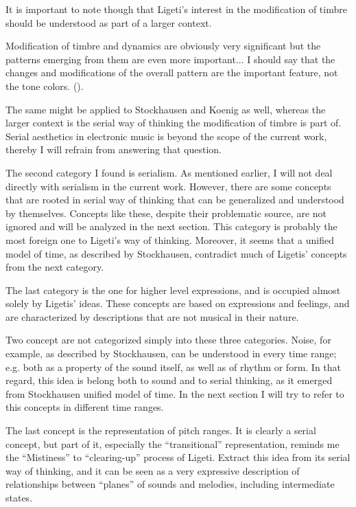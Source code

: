 \documentclass[a4paper,11pt]{article}
\newenvironment{MyShadequote}[1][]
    {\begin{mdframed}[style=MyShadeQuoteStyle,#1]}
    {\end{mdframed}}
\begin{document}
It is important to note though that Ligeti's interest in the modification of timbre should be understood as part of a larger context.

\begin{MyShadequote}
  Modification of timbre and dynamics are obviously very significant but the patterns emerging from them are even more important...
  I should say that the changes and modifications of the overall pattern are the important feature, not the tone colors. (\cite[p. 39]{varnai}).
\end{MyShadequote}

The same might be applied to Stockhausen and Koenig as well, whereas the larger context is the serial way of thinking the modification of timbre is part of.
Serial aesthetics in electronic music is beyond the scope of the current work, thereby I will refrain from answering that question.

The second category I found is serialism.
As mentioned earlier, I will not deal directly with serialism in the current work.
However, there are some concepts that are rooted in serial way of thinking that can be generalized and understood by themselves.
Concepts like these, despite their problematic source, are not ignored and will be analyzed in the next section.
This category is probably the most foreign one to Ligeti's way of thinking.
Moreover, it seems that a unified model of time, as described by Stockhausen, contradict much of Ligetis' concepts from the next category.

The last category is the one for higher level expressions, and is occupied almost solely by Ligetis' ideas.
These concepts are based on expressions and feelings, and are characterized by descriptions that are not musical in their nature.

Two concept are not categorized simply into these three categories.
Noise, for example, as described by Stockhausen, can be understood in every time range;
e.g. both as a property of the sound itself, as well as of rhythm or form.
In that regard, this idea is belong both to sound and to serial thinking, as it emerged from Stockhausen unified model of time.
In the next section I will try to refer to this concepts in different time ranges.

The last concept is the representation of pitch ranges.
It is clearly a serial concept, but part of it, especially the ``transitional'' representation, reminds me the ``Mistiness'' to ``clearing-up'' process of Ligeti.
Extract this idea from its serial way of thinking, and it can be seen as a very expressive description of relationships between ``planes'' of sounds and melodies, including intermediate states.
\end{document}
